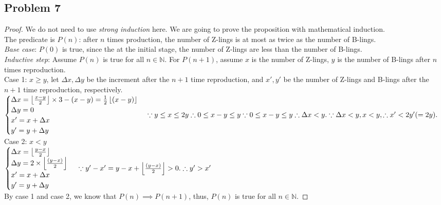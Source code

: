 \documentclass{article}
\begin{document}
\subsection{Problem 7}
\begin{proof}
We do not need to use \textit{strong induction} here. We are going to prove the proposition with mathematical induction.
\\ The predicate is $P(n)$: after $n$ times production, the number of Z-lings is at most as twice as the number of B-lings.
\\ \textit{Base case}: $P(0)$ is true, since the at the initial stage, the number of Z-lings are less than the number of B-lings.
\\ \textit{Inductive step}: Assume $P(n)$ is true for all $n \in \mathbb{N}$. For $P(n+1)$, assume $x$ is the number of Z-lings, $y$ is the number of B-lings after $n$ times reproduction.
\\ Case 1: $x \geq y$, let $\Delta x, \Delta y$ be the increment after the $n+1$ time reproduction, and $x', y'$ be the number of Z-lings and B-lings after the $n+1$ time reproduction, respectively.
\\
$
\begin{cases}
\Delta x = \left\lfloor\frac{x - y}{2}\right\rfloor \times 3 - (x-y) = \frac{1}{2} \left\lfloor(x-y)\right\rfloor
\\\Delta y = 0
\\ x' = x + \Delta x
\\ y' = y + \Delta y
\end{cases}
\because y \leq x \leq 2y \therefore 0 \leq x-y \leq y
\\ \because 0 \leq x-y \leq y \therefore \Delta x < y.
\\ \because \Delta x < y, x < y, \therefore x' < 2y'(=2y).
$
\\ Case 2: $x < y$
\\
$
\begin{cases}
\Delta x = \left\lfloor \frac{y-x}{2} \right\rfloor
\\ \Delta y = 2 \times \left\lfloor \frac{(y-x)}{2} \right\rfloor
\\ x' = x + \Delta x
\\ y' = y + \Delta y
\end{cases}
\\ \because y'-x' = y-x+\left\lfloor\frac{(y-x)}{2}\right\rfloor > 0.
\\ \therefore y' > x'
$
\\ By case 1 and case 2, we know that $P(n) \implies P(n+1)$, thus, $P(n)$ is true for all $n \in \mathbb{N}$.
\end{proof}
\end{document}
